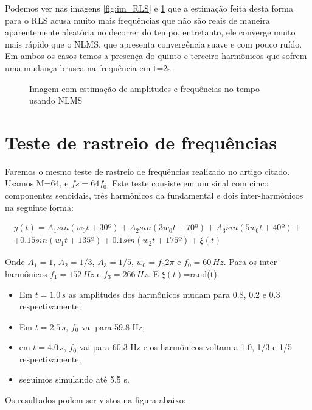 Podemos ver nas imagens \ref{fig:im_RLS} e \ref{fig:im_NLMS} que a estimação feita desta forma para o RLS acusa muito mais frequências que não são reais de maneira aparentemente aleatória no decorrer do tempo, entretanto, ele converge muito mais rápido que o NLMS, que apresenta convergência suave e com pouco ruído. Em ambos os casos temos a presença do quinto e terceiro harmônicos que sofrem uma mudança brusca na frequência em t=2s.


\begin{figure}[H]
	\centering    
	\def\svgwidth{\columnwidth}
	
	\caption{Imagem com estimação de amplitudes e frequências no tempo usando NLMS}
	\label{fig:im_NLMS}
\end{figure}


\section{Teste de rastreio de frequências}

Faremos o mesmo teste de rastreio de frequências realizado no artigo citado. Usamos M=64, e $fs=64f_0$. Este teste consiste em um sinal com cinco componentes senoidais, três harmônicos da fundamental e dois inter-harmônicos na seguinte forma:

\begin{equation}
\begin{split}
	y(t)=A_1 sin(w_0 t+30º)+A_2 sin(3w_0 t+70º)+ A_3 sin(5w_0 t+40º) + \\ + 0.15 sin(w_1 t+135º)+ 0.1 sin(w_2 t + 175º) + \xi(t)
\end{split}
\end{equation}

Onde $A_1=1$, $A_2=1/3$, $A_3=1/5$, $w_0=f_0 2 \pi$ e $f_0=60 \, Hz$. Para os inter-harmônicos $f_1=152 \, Hz$ e $f_3= 266 \, Hz$. E $\xi(t)$=rand(t). 
\begin{itemize}
	\item Em $t=1.0 \,s$ as amplitudes dos harmônicos mudam para 0.8, 0.2 e 0.3 respectivamente; 
	\item Em $t=2.5 \,s$, $f_0$ vai para 59.8 Hz;
	\item em $t=4.0 \,s$, $f_0$ vai para 60.3 Hz e os harmônicos voltam a 1.0, 1/3 e 1/5 respectivamente;
	\item seguimos simulando até 5.5 s.
\end{itemize}

Os resultados podem ser vistos na figura abaixo: 


